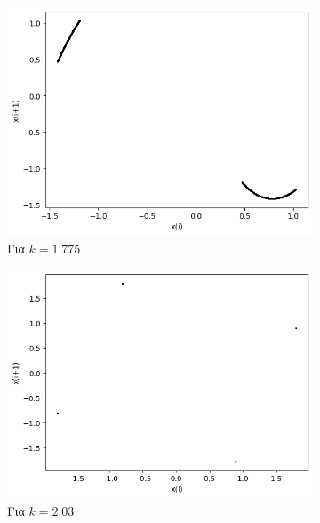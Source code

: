 \begin{figure}[ht]
	\centering
	\begin{subfigure}[b]{0.4\textwidth}
		\centering
		\includegraphics[width=\textwidth]{LateX images/sine q=-0.5/g16}
		\caption{Για $k=1.775$}
		\label{f:k127}
	\end{subfigure}
	\hfill
	\begin{subfigure}[b]{0.4\textwidth}
		\centering
		\includegraphics[width=\textwidth]{LateX images/sine q=-0.5/g17}
		\caption{Για $k=2.03$}
		\label{f:k128}
	\end{subfigure}
	\hfill
	\begin{subfigure}[b]{0.4\textwidth}
		\centering

\end{subfigure}
\end{figure}
